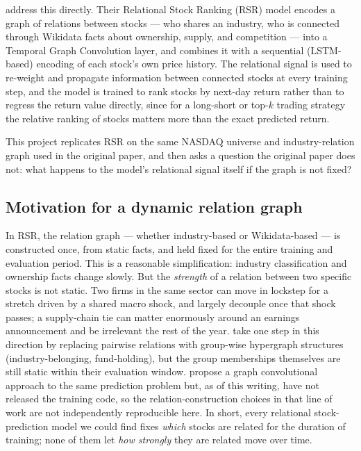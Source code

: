 \documentclass[12pt]{article}
\begin{document}
\citet{feng2019temporal} address this directly. Their Relational Stock Ranking (RSR) model
encodes a graph of relations between stocks --- who shares an industry, who is connected through
Wikidata facts about ownership, supply, and competition --- into a Temporal Graph Convolution
layer, and combines it with a sequential (LSTM-based) encoding of each stock's own price history.
The relational signal is used to re-weight and propagate information between connected stocks at
every training step, and the model is trained to rank stocks by next-day return rather than to
regress the return value directly, since for a long-short or top-$k$ trading strategy the relative
ranking of stocks matters more than the exact predicted return.

This project replicates RSR on the same NASDAQ universe and industry-relation graph used in the
original paper, and then asks a question the original paper does not: what happens to the model's
relational signal itself if the graph is not fixed?

\subsection{Motivation for a dynamic relation graph}

In RSR, the relation graph --- whether industry-based or Wikidata-based --- is constructed once,
from static facts, and held fixed for the entire training and evaluation period. This is a
reasonable simplification: industry classification and ownership facts change slowly. But the
\emph{strength} of a relation between two specific stocks is not static. Two firms in the same
sector can move in lockstep for a stretch driven by a shared macro shock, and largely decouple
once that shock passes; a supply-chain tie can matter enormously around an earnings announcement
and be irrelevant the rest of the year. \citet{cui2023temporal} take one step in this direction by
replacing pairwise relations with group-wise hypergraph structures (industry-belonging,
fund-holding), but the group memberships themselves are still static within their evaluation
window. \citet{jafari2022gcnet} propose a graph convolutional approach to the same prediction
problem but, as of this writing, have not released the training code, so the relation-construction
choices in that line of work are not independently reproducible here. In short, every relational
stock-prediction model we could find fixes \emph{which} stocks are related for the duration of
training; none of them let \emph{how strongly} they are related move over time.
\end{document}
